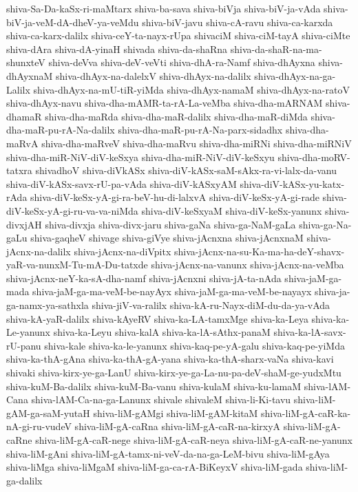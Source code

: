 {shiva-Sa-Da-kaSx-ri-maMtarx
shiva-ba-sava
shiva-biVja
shiva-biV-ja-vAda
shiva-biV-ja-veM-dA-dheV-ya-veMdu
shiva-biV-javu
shiva-cA-ravu
shiva-ca-karxda
shiva-ca-karx-dalilx
shiva-ceY-ta-nayx-rUpa
shivaciM
shiva-ciM-tayA
shiva-ciMte
shiva-dAra
shiva-dA-yinaH
shivada
shiva-da-shaRna
shiva-da-shaR-na-ma-shunxteV
shiva-deVva
shiva-deV-veVti
shiva-dhA-ra-Namf
shiva-dhAyxna
shiva-dhAyxnaM
shiva-dhAyx-na-dalelxV
shiva-dhAyx-na-dalilx
shiva-dhAyx-na-ga-Lalilx
shiva-dhAyx-na-mU-tiR-yiMda
shiva-dhAyx-namaM
shiva-dhAyx-na-ratoV
shiva-dhAyx-navu
shiva-dha-mAMR-ta-rA-La-veMba
shiva-dha-mARNAM
shiva-dhamaR
shiva-dha-maRda
shiva-dha-maR-dalilx
shiva-dha-maR-diMda
shiva-dha-maR-pu-rA-Na-dalilx
shiva-dha-maR-pu-rA-Na-parx-sidadhx
shiva-dha-maRvA
shiva-dha-maRveV
shiva-dha-maRvu
shiva-dha-miRNi
shiva-dha-miRNiV
shiva-dha-miR-NiV-diV-keSxya
shiva-dha-miR-NiV-diV-keSxyu
shiva-dha-moRV-tatxra
shivadhoV
shiva-diVkASx
shiva-diV-kASx-saM-sAkx-ra-vi-lalx-da-vanu
shiva-diV-kASx-savx-rU-pa-vAda
shiva-diV-kASxyAM
shiva-diV-kASx-yu-katx-rAda
shiva-diV-keSx-yA-gi-ra-beV-hu-di-lalxvA
shiva-diV-keSx-yA-gi-rade
shiva-diV-keSx-yA-gi-ru-va-va-niMda
shiva-diV-keSxyaM
shiva-diV-keSx-yanunx
shiva-divxjAH
shiva-divxja
shiva-divx-jaru
shiva-gaNa
shiva-ga-NaM-gaLa
shiva-ga-Na-gaLu
shiva-gaqheV
shivage
shiva-giVye
shiva-jAcnxna
shiva-jAcnxnaM
shiva-jAcnx-na-dalilx
shiva-jAcnx-na-diVpitx
shiva-jAcnx-na-su-Ka-ma-ha-deY-shavx-yaR-va-nunxM-Tu-mA-Du-tatxde
shiva-jAcnx-na-vanunx
shiva-jAcnx-na-veMba
shiva-jAcnx-neY-ka-sA-dha-namf
shiva-jAcnxni
shiva-jA-ta-nAda
shiva-jaM-ga-mada
shiva-jaM-ga-ma-veM-be-nayAyx
shiva-jaM-ga-ma-veM-be-nayayx
shiva-ja-ga-namx-ya-sathxla
shiva-jiV-va-ralilx
shiva-kA-ru-Nayx-diM-du-da-ya-vAda
shiva-kA-yaR-dalilx
shiva-kAyeRV
shiva-ka-LA-tamxMge
shiva-ka-Leya
shiva-ka-Le-yanunx
shiva-ka-Leyu
shiva-kalA
shiva-ka-lA-sAthx-panaM
shiva-ka-lA-savx-rU-panu
shiva-kale
shiva-ka-le-yanunx
shiva-kaq-pe-yA-galu
shiva-kaq-pe-yiMda
shiva-ka-thA-gAna
shiva-ka-thA-gA-yana
shiva-ka-thA-sharx-vaNa
shiva-kavi
shivaki
shiva-kirx-ye-ga-LanU
shiva-kirx-ye-ga-La-nu-pa-deV-shaM-ge-yudxMtu
shiva-kuM-Ba-dalilx
shiva-kuM-Ba-vanu
shiva-kulaM
shiva-ku-lamaM
shiva-lAM-Cana
shiva-lAM-Ca-na-ga-Lanunx
shivale
shivaleM
shiva-li-Ki-tavu
shiva-liM-gAM-ga-saM-yutaH
shiva-liM-gAMgi
shiva-liM-gAM-kitaM
shiva-liM-gA-caR-ka-nA-gi-ru-vudeV
shiva-liM-gA-caRna
shiva-liM-gA-caR-na-kirxyA
shiva-liM-gA-caRne
shiva-liM-gA-caR-nege
shiva-liM-gA-caR-neya
shiva-liM-gA-caR-ne-yanunx
shiva-liM-gAni
shiva-liM-gA-tamx-ni-veV-da-na-ga-LeM-bivu
shiva-liM-gAya
shiva-liMga
shiva-liMgaM
shiva-liM-ga-ca-rA-BiKeyxV
shiva-liM-gada
shiva-liM-ga-dalilx
}
